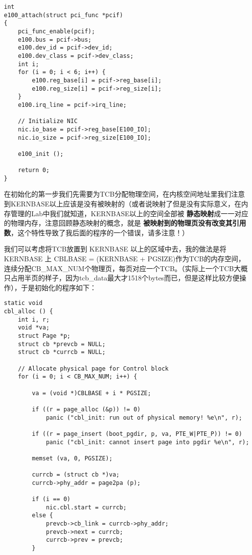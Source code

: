 \documentclass{article}
\newcommand{\highlight}[1]{{\bfseries \color{red}  #1}}
\begin{document}
\begin{CJK*}{UTF8}{gkai}
\begin{lstlisting}[style=ccode, title={\scriptsize \ttfamily \bfseries kern/e100.c}]
int
e100_attach(struct pci_func *pcif) 
{
    pci_func_enable(pcif);
    e100.bus = pcif->bus;
    e100.dev_id = pcif->dev_id;
    e100.dev_class = pcif->dev_class;
    int i;
    for (i = 0; i < 6; i++) {
    	e100.reg_base[i] = pcif->reg_base[i];
        e100.reg_size[i] = pcif->reg_size[i];
    }
    e100.irq_line = pcif->irq_line;

    // Initialize NIC
    nic.io_base = pcif->reg_base[E100_IO];
    nic.io_size = pcif->reg_size[E100_IO];

    e100_init ();

    return 0;
}
\end{lstlisting}

在初始化的第一步我们先需要为TCB分配物理空间，在内核空间地址里我们注意到KERNBASE以上应该是没有被映射的（或者说映射了但是没有实际意义，在内存管理的Lab中我们就知道，KERNBASE以上的空间全部被\highlight{静态映射}成一一对应的物理内存，注意回顾静态映射的概念，就是\highlight{被映射到的物理页没有改变其引用数}，这个特性导致了我后面的程序的一个错误，请多注意！）

我们可以考虑将TCB放置到 KERNBASE 以上的区域中去，我的做法是将 KERNBASE 上 CBLBASE = (KERNBASE + PGSIZE)作为TCB的内存空间，连续分配CB\_MAX\_NUM个物理页，每页对应一个TCB。（实际上一个TCB大概只占用半页的样子，因为tcb\_data最大才1518个bytes而已，但是这样比较方便操作），于是初始化的程序如下：


\begin{lstlisting}[style=ccode, title={\scriptsize \ttfamily \bfseries kern/e100.c: cbl\_alloc()}]
static void
cbl_alloc () {
    int i, r;
    void *va;
    struct Page *p;
    struct cb *prevcb = NULL;
    struct cb *currcb = NULL;

    // Allocate physical page for Control block
    for (i = 0; i < CB_MAX_NUM; i++) {

        va = (void *)CBLBASE + i * PGSIZE;

        if ((r = page_alloc (&p)) != 0)
            panic ("cbl_init: run out of physical memory! %e\n", r);

        if ((r = page_insert (boot_pgdir, p, va, PTE_W|PTE_P)) != 0)
            panic ("cbl_init: cannot insert page into pgdir %e\n", r);

        memset (va, 0, PGSIZE);

        currcb = (struct cb *)va;
        currcb->phy_addr = page2pa (p);

        if (i == 0)
            nic.cbl.start = currcb;
        else {
            prevcb->cb_link = currcb->phy_addr;
            prevcb->next = currcb;
            currcb->prev = prevcb;
        }


\end{lstlisting}
\end{CJK*}
\end{document}
